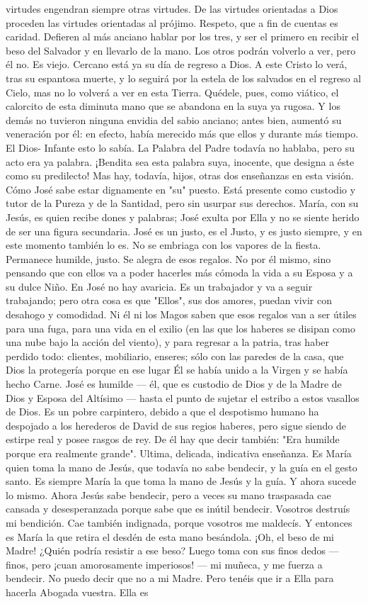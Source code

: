 \documentclass[12pt]{book} %
\begin{document}
virtudes engendran siempre otras virtudes. De las virtudes orientadas a Dios proceden las virtudes orientadas al prójimo. Respeto, que a fin de cuentas es caridad. Defieren al más anciano hablar por los tres, y ser el primero en recibir el beso del Salvador y en llevarlo de la mano. Los otros podrán volverlo a ver, pero él no. Es viejo. Cercano está ya su día de regreso a Dios. A este Cristo lo verá, tras su espantosa muerte, y lo seguirá por la estela de los salvados en el regreso al Cielo, mas no lo volverá a ver en esta Tierra. Quédele, pues, como viático, el calorcito de esta diminuta mano que se abandona en la suya ya rugosa. Y los demás no tuvieron ninguna envidia del sabio anciano; antes bien, aumentó su veneración por él: en efecto, había merecido más que ellos y durante más tiempo. El Dios- Infante esto lo sabía. La Palabra del Padre todavía no hablaba, pero su acto era ya palabra. ¡Bendita sea esta palabra suya, inocente, que designa a éste como su predilecto! Mas hay, todavía, hijos, otras dos enseñanzas en esta visión. Cómo José sabe estar dignamente en "su" puesto. Está presente como custodio y tutor de la Pureza y de la Santidad, pero sin usurpar sus derechos. María, con su Jesús, es quien recibe dones y palabras; José exulta por Ella y no se siente herido de ser una figura secundaria. José es un justo, es el Justo, y es justo siempre, y en este momento también lo es. No se embriaga con los vapores de la fiesta. Permanece humilde, justo. Se alegra de esos regalos. No por él mismo, sino pensando que con ellos va a poder hacerles más cómoda la vida a su Esposa y a su dulce Niño. En José no hay avaricia. Es un trabajador y va a seguir trabajando; pero otra cosa es que "Ellos", sus dos amores, puedan vivir con desahogo y comodidad. Ni él ni los Magos saben que esos regalos van a ser útiles para una fuga, para una vida en el exilio (en las que los haberes se disipan como una nube bajo la acción del viento), y para regresar a la patria, tras haber perdido todo: clientes, mobiliario, enseres; sólo con las paredes de la casa, que Dios la protegería porque en ese lugar Él se había unido a la Virgen y se había hecho Carne. José es humilde — él, que es custodio de Dios y de la Madre de Dios y Esposa del Altísimo — hasta el punto de sujetar el estribo a estos vasallos de Dios. Es un pobre carpintero, debido a que el despotismo humano ha despojado a los herederos de David de sus regios haberes, pero sigue siendo de estirpe real y posee rasgos de rey. De él hay que decir también: "Era humilde porque era realmente grande". Ultima, delicada, indicativa enseñanza. Es María quien toma la mano de Jesús, que todavía no sabe bendecir, y la guía en el gesto santo. Es siempre María la que toma la mano de Jesús y la guía. Y ahora sucede lo mismo. Ahora Jesús sabe bendecir, pero a veces su mano traspasada cae cansada y desesperanzada porque sabe que es inútil bendecir. Vosotros destruís mi bendición. Cae también indignada, porque vosotros me maldecís. Y entonces es María la que retira el desdén de esta mano besándola. ¡Oh, el beso de mi Madre! ¿Quién podría resistir a ese beso? Luego toma con sus finos dedos — finos, pero ¡cuan amorosamente imperiosos! — mi muñeca, y me fuerza a bendecir. No puedo decir que no a mi Madre. Pero tenéis que ir a Ella para hacerla Abogada vuestra. Ella es 
\end{document}
